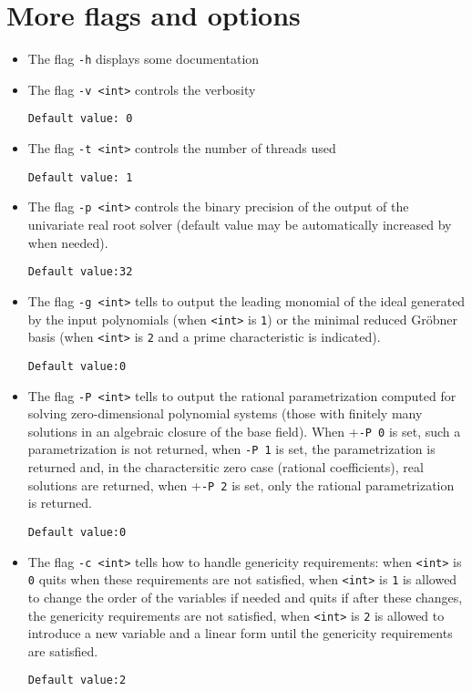 \documentclass[a4paper,english,11pt]{scrartcl}
\theoremstyle{definition}
\theoremstyle{remark}
\begin{document}
\section{More flags and options}\label{sec:flags}

\begin{itemize}
\item The flag \verb+-h+ displays some documentation

\item The flag \verb+-v <int>+ controls the verbosity

  \hfill \verb+Default value: 0+

\item The flag \verb+-t <int>+ controls the number of threads used

  \hfill \verb+Default value: 1+

\item The flag \verb+-p <int>+ controls the binary precision of the output of the 
    univariate real root
    solver (default value may be automatically increased by \msolve when needed).

    \hfill \verb+Default value:32+
\item The flag \verb+-g <int>+ tells \msolve to output the leading monomial of
  the ideal generated by the input polynomials (when \verb+<int>+ is \verb+1+)
  or the minimal reduced Gr\"obner basis (when \verb+<int>+ is \verb+2+ and
  a prime characteristic is indicated).

  \hfill \verb+Default value:0+

\item The flag \verb+-P <int>+ tells \msolve to output the 
rational parametrization computed for solving zero-dimensional polynomial 
systems (those with finitely many solutions in an algebraic closure of the base field).
When +\verb+-P 0+ is set, such a parametrization is not returned, when \verb+-P 1+ is
set, the parametrization is returned and, in the charactersitic zero case (rational 
coefficients), real solutions are returned, when +\verb+-P 2+ is set, only the 
rational parametrization is returned.

  \hfill \verb+Default value:0+


\item The flag \verb+-c <int>+ tells \msolve how to handle genericity
  requirements: when \verb+<int>+ is \verb+0+ \msolve quits when these
  requirements are not satisfied, when \verb+<int>+ is \verb+1+ \msolve is
  allowed to change the order of the variables if needed and quits if after
  these changes, the genericity requirements are not satisfied,  when
  \verb+<int>+ is \verb+2+ \msolve is allowed to introduce a new variable and a
  linear form until the genericity requirements are satisfied. 

  \hfill \verb+Default value:2+

\end{itemize}
\end{document}
